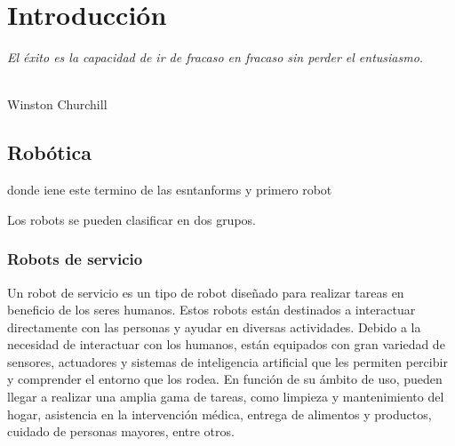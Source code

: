 \chapter{Introducción}
\label{cap:capitulo1}
\setcounter{page}{1}

\begin{flushright}
\begin{minipage}[]{10cm}
\emph{El éxito es la capacidad de ir de fracaso en fracaso sin perder el entusiasmo.}\\
\end{minipage}\\

Winston Churchill\\
\end{flushright}

\vspace{1cm}


\section{Robótica}
\label{sec:rob}

donde iene este termino
de las esntanforms y primero robot

Los robots se pueden clasificar en dos grupos.
\subsection{Robots de servicio}
Un robot de servicio es un tipo de robot diseñado para realizar tareas en beneficio de los seres humanos. Estos robots están 
destinados a interactuar directamente con las personas y ayudar en diversas actividades. 
Debido a la necesidad de interactuar con los humanos, están equipados con gran variedad de sensores, actuadores y sistemas de 
inteligencia artificial que les permiten percibir y comprender el entorno que los rodea. 
En función de su ámbito de uso, pueden llegar a realizar una amplia gama de tareas, como limpieza y mantenimiento del hogar, 
asistencia en la intervención médica, entrega de alimentos y productos, cuidado de personas mayores, entre otros.

